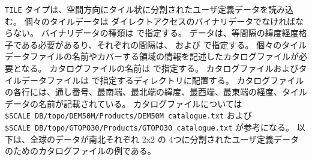 \verb|TILE| タイプは、空間方向にタイル状に分割されたユーザ定義データを読み込む。
個々のタイルデータは ダイレクトアクセスのバイナリデータでなければならない。
バイナリデータの種類は  で指定する。
データは、等間隔の緯度経度格子である必要があるり、それぞれの間隔は、 および  で指定する。
個々のタイルデータファイルの名前やカバーする領域の情報を記述したカタログファイルが必要となる。
カタログファイルの名前は  で指定する。
カタログファイルおよびタイルデータファイルは  で指定するディレクトリに配置する。
カタログファイルの各行には、通し番号、最南端、最北端の緯度、最西端、最東端の経度、タイルデータの名前が記載されている。
カタログファイルについては \verb|$SCALE_DB/topo/DEM50M/Products/DEM50M_catalogue.txt| および \verb|$SCALE_DB/topo/GTOPO30/Products/GTOPO30_catalogue.txt| が参考になる。
以下は、全球のデータが南北それぞれ 2x2 の 4つに分割されたユーザ定義データのためのカタログファイルの例である。

